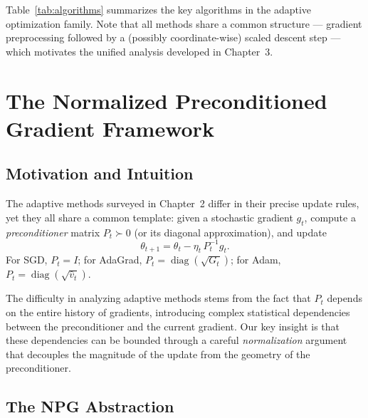 \documentclass[11pt,twoside,openright]{book}
\begin{document}
Table~\ref{tab:algorithms} summarizes the key algorithms in the adaptive optimization family.
Note that all methods share a common structure — gradient preprocessing followed by a
(possibly coordinate-wise) scaled descent step — which motivates the unified analysis developed
in Chapter~3.


\chapter{The Normalized Preconditioned Gradient Framework}

\section{Motivation and Intuition}

The adaptive methods surveyed in Chapter~2 differ in their precise update rules, yet they all
share a common template: given a stochastic gradient $g_t$, compute a \emph{preconditioner}
matrix $P_t \succ 0$ (or its diagonal approximation), and update
\begin{equation}
  \theta_{t+1} = \theta_t - \eta_t\, P_t^{-1} g_t.
  \label{eq:generic_precond}
\end{equation}
For SGD, $P_t = I$; for AdaGrad, $P_t = \operatorname{diag}(\sqrt{G_t})$; for Adam,
$P_t = \operatorname{diag}(\sqrt{\hat{v}_t})$.

The difficulty in analyzing adaptive methods stems from the fact that $P_t$ depends on the
entire history of gradients, introducing complex statistical dependencies between the
preconditioner and the current gradient. Our key insight is that these dependencies can be
bounded through a careful \emph{normalization} argument that decouples the magnitude of the
update from the geometry of the preconditioner.

\section{The NPG Abstraction}
\end{document}
